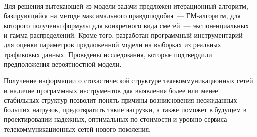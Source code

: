 \begin{multicols}{2}
\begin{figure*} %
\vspace*{1pt}
\begin{center}
\mbox{%
\epsfxsize=130mm %
 }
\end{center}
\vspace*{-16pt} 
\vspace*{12pt}
\begin{center}
\mbox{%
\epsfxsize=130mm %
 }
\end{center}
\vspace*{-11pt} 
\end{figure*}

\begin{figure*} %
\vspace*{1pt}
\begin{center}
\mbox{%
\epsfxsize=119.041mm
 }
\end{center}
\vspace*{-9pt} 
\end{figure*}

Для решения вытекающей из модели задачи предложен итерационный алгоритм,
базирующийся на методе максимального правдоподобия~--- ЕМ-ал\-го\-ритм, для
которого получены формулы для конкретного вида смесей~--- экспоненциальных и
гамма-распределений.
%
Кроме того, разработан программный инструментарий для оценки параметров 
предложенной модели на выборках из реальных трафиковых данных. Проведены 
исследования, которые подтвердили предположения вероятностной модели. 


Получение информации о стохастической структуре
телекоммуникационных сетей и наличие программных инструментов для
выявления более или менее стабильных структур позволит понять причины
возникновения неожиданных больших нагрузок, предотвратить такие нагрузки,
а также поможет в будущем в проектировании надежных, оптимальных по
стоимости и уровню сервиса телекоммуникационных сетей нового поколения.


\end{multicols}
